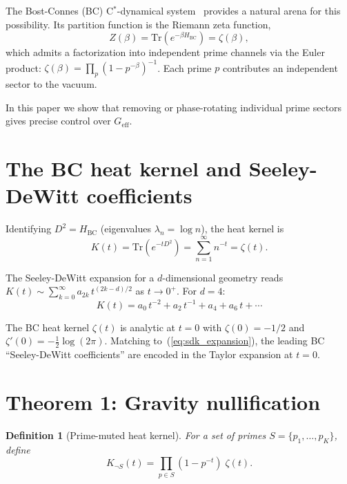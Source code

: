 \documentclass[aps,prd,twocolumn,superscriptaddress,nofootinbib]{revtex4-2}
\newtheorem{definition}[theorem]{Definition}
\newcommand{\Tr}{\mathrm{Tr}}
\begin{document}
The Bost-Connes (BC) C$^*$-dynamical system~\cite{BostConnes1995}
provides a natural arena for this possibility.  Its partition function
is the Riemann zeta function,
\begin{equation}
  Z(\beta) = \Tr(e^{-\beta H_{\mathrm{BC}}}) = \zeta(\beta),
  \label{eq:bc}
\end{equation}
which admits a factorization into independent prime channels
via the Euler product:
$\zeta(\beta) = \prod_p (1 - p^{-\beta})^{-1}$.
Each prime $p$ contributes an independent sector to the vacuum.

In this paper we show that removing or phase-rotating
individual prime sectors gives precise control over $G_{\mathrm{eff}}$.

\section{The BC heat kernel and Seeley-DeWitt coefficients}
\label{sec:sdk}

Identifying $D^2 = H_{\mathrm{BC}}$ (eigenvalues $\lambda_n = \log n$),
the heat kernel is
\begin{equation}
  K(t) = \Tr(e^{-t D^2}) = \sum_{n=1}^\infty n^{-t} = \zeta(t).
\end{equation}

The Seeley-DeWitt expansion for a $d$-dimensional geometry reads
$K(t) \sim \sum_{k=0}^\infty a_{2k}\, t^{(2k-d)/2}$ as $t \to 0^+$.
For $d = 4$:
\begin{equation}
  K(t) = a_0\, t^{-2} + a_2\, t^{-1} + a_4 + a_6\, t + \cdots
  \label{eq:sdk_expansion}
\end{equation}

The BC heat kernel $\zeta(t)$ is analytic at $t = 0$ with
$\zeta(0) = -1/2$ and $\zeta'(0) = -\tfrac{1}{2}\log(2\pi)$.
Matching to~(\ref{eq:sdk_expansion}), the leading BC ``Seeley-DeWitt
coefficients'' are encoded in the Taylor expansion at $t = 0$.

\section{Theorem 1: Gravity nullification}
\label{sec:nullification}

\begin{definition}[Prime-muted heat kernel]
For a set of primes $S = \{p_1, \ldots, p_K\}$, define
\begin{equation}
  K_{\neg S}(t) = \prod_{p \in S}(1 - p^{-t})\;\zeta(t).
\end{equation}
\end{definition}
\end{document}
